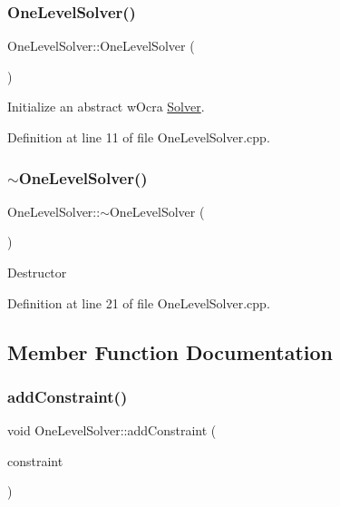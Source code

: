 \subsubsection{\texorpdfstring{One\+Level\+Solver()}{OneLevelSolver()}}
{\footnotesize\ttfamily One\+Level\+Solver\+::\+One\+Level\+Solver (\begin{DoxyParamCaption}{ }\end{DoxyParamCaption})}

Initialize an abstract w\+Ocra \hyperlink{classocra_1_1Solver}{Solver}. 

Definition at line 11 of file One\+Level\+Solver.\+cpp.

\hypertarget{classocra_1_1OneLevelSolver_a12fba5d2e72bdbeab5168b567c164687}{}\label{classocra_1_1OneLevelSolver_a12fba5d2e72bdbeab5168b567c164687} 
\subsubsection{\texorpdfstring{$\sim$\+One\+Level\+Solver()}{~OneLevelSolver()}}
{\footnotesize\ttfamily One\+Level\+Solver\+::$\sim$\+One\+Level\+Solver (\begin{DoxyParamCaption}{ }\end{DoxyParamCaption})\hspace{0.3cm}{\ttfamily [virtual]}}

Destructor 

Definition at line 21 of file One\+Level\+Solver.\+cpp.



\subsection{Member Function Documentation}
\hypertarget{classocra_1_1OneLevelSolver_a6f4ea581d38ef75032d15b954280e790}{}\label{classocra_1_1OneLevelSolver_a6f4ea581d38ef75032d15b954280e790} 
\subsubsection{\texorpdfstring{add\+Constraint()}{addConstraint()}}
{\footnotesize\ttfamily void One\+Level\+Solver\+::add\+Constraint (\begin{DoxyParamCaption}\item[{\hyperlink{namespaceocra_ae8b87cf4099be3efc3b410019ad2046e}{ocra\+::\+Linear\+Constraint} \&}]{constraint }\end{DoxyParamCaption})}

